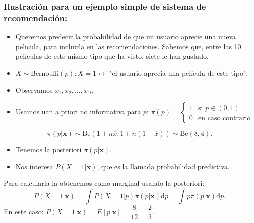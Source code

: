 \subsubsection{Ilustración para un ejemplo simple de sistema de recomendación:}
\begin{tcolorbox}[colback=blue!5!white, colframe=blue!75!black, title=\textbf{Contexto:}]
\begin{itemize}[label=\textbullet]
    \item Queremos predecir la probabilidad de que un usuario aprecie una nueva pelicula, para incluirla en las recomendaciones. Sabemos que, entre las 10 películas de este mismo tipo que ha visto, siete le han gustado.
    \item $X\sim \mathrm{Bernoulli}(p):X=1\longleftrightarrow$ "el usuario aprecia una película de este tipo".
    \item Observamos $x_1,x_2,\dots,x_{10}$.
    \item Usamos uan a priori no informativa para $p:\, \pi(p)=\begin{cases}
            1 & \text{si }p\in (0,1)\\
            0 & \text{en caso contrario}
    \end{cases}$
\end{itemize}
\end{tcolorbox}
\[
\pi(p|\mathbf{x})\sim \mathrm{Be}(1+n\overline{x},1+n(1-\overline{x}))\sim \mathrm{Be}(8,4).
\] 
\begin{tcolorbox}[colback=blue!5!white, colframe=blue!75!black, title=\textbf{Inferencia bayesiana predictiva:}]
\begin{itemize}[label=\textbullet]
    \item Tenemos la posteriori $\pi(p|\mathbf{x})$.
    \item Nos interesa $P(X=1|\mathbf{x})$, que es la llamada probabilidad predictiva.
\end{itemize}
\end{tcolorbox}
Para calcularla la obtenemos como marginal usando la posteriori: \[
P(X=1|\mathbf{x})=\int P(X=1|p)\pi(p|\mathbf{x})\mathrm{d}p=\int p\pi(p|\mathbf{x})\mathrm{d}p.
\] 
En este caso: $P(X=1|\mathbf{x})=E[p|\mathbf{x}]=\dfrac{8}{12}=\dfrac{2}{3}$.
\newpage

